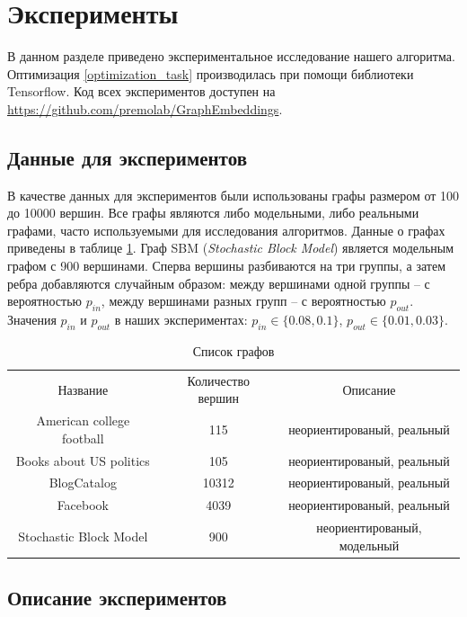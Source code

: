 \documentclass[12pt,a4paper]{extarticle}
\begin{document}
    
    \section{Эксперименты}
    В данном разделе приведено экспериментальное исследование нашего алгоритма. Оптимизация \eqref{optimization_task} производилась при помощи библиотеки Tensorflow.
    Код всех экспериментов доступен на \url{https://github.com/premolab/GraphEmbeddings}.
    
    \subsection{Данные для экспериментов}
    
    В качестве данных для экспериментов были использованы графы размером от 100 до 10000 вершин.
    Все графы являются либо модельными, либо реальными графами, часто используемыми для исследования алгоритмов. Данные о графах приведены в таблице \ref{table_graphs}.
    Граф SBM (\textit{Stochastic Block Model}) является модельным графом с 900 вершинами. Сперва вершины разбиваются на три группы, а затем ребра добавляются случайным образом: между вершинами одной группы -- с вероятностью $p_{in}$, между вершинами разных групп -- с вероятностью $p_{out}$. Значения $p_{in}$ и $p_{out}$ в наших экспериментах: $p_{in} \in \{0.08, 0.1\}$, $p_{out} \in \{0.01, 0.03\}$.
    
    \begin{table}
    \begin{center}
    \begin{tabular}{ccc}
    	Название & Количество вершин & Описание\\
        \noalign{\smallskip}
        \hline
        \noalign{\smallskip}
        American college football & 115 & неориентированый, реальный \\
        Books about US politics & 105 & неориентированый, реальный \\
        BlogCatalog & 10312 & неориентированый, реальный \\
        Facebook & 4039 & неориентированый, реальный \\
        Stochastic Block Model & 900 & неориентированый, модельный
    \end{tabular}
    \end{center}
    \caption{Список графов} \label{table_graphs}
    \end{table}
    
    \subsection{Описание экспериментов}
    
\end{document}
